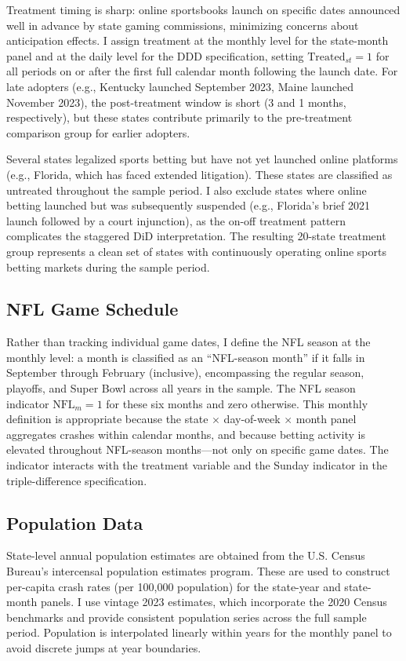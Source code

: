 \documentclass[12pt]{article}
\begin{document}
Treatment timing is sharp: online sportsbooks launch on specific dates announced well in advance by state gaming commissions, minimizing concerns about anticipation effects. I assign treatment at the monthly level for the state-month panel and at the daily level for the DDD specification, setting $\text{Treated}_{st} = 1$ for all periods on or after the first full calendar month following the launch date. For late adopters (e.g., Kentucky launched September 2023, Maine launched November 2023), the post-treatment window is short (3 and 1 months, respectively), but these states contribute primarily to the pre-treatment comparison group for earlier adopters.

Several states legalized sports betting but have not yet launched online platforms (e.g., Florida, which has faced extended litigation). These states are classified as untreated throughout the sample period. I also exclude states where online betting launched but was subsequently suspended (e.g., Florida's brief 2021 launch followed by a court injunction), as the on-off treatment pattern complicates the staggered DiD interpretation. The resulting 20-state treatment group represents a clean set of states with continuously operating online sports betting markets during the sample period.

\subsection{NFL Game Schedule}

Rather than tracking individual game dates, I define the NFL season at the monthly level: a month is classified as an ``NFL-season month'' if it falls in September through February (inclusive), encompassing the regular season, playoffs, and Super Bowl across all years in the sample. The NFL season indicator $\text{NFL}_m = 1$ for these six months and zero otherwise. This monthly definition is appropriate because the state $\times$ day-of-week $\times$ month panel aggregates crashes within calendar months, and because betting activity is elevated throughout NFL-season months---not only on specific game dates. The indicator interacts with the treatment variable and the Sunday indicator in the triple-difference specification.

\subsection{Population Data}

State-level annual population estimates are obtained from the U.S. Census Bureau's intercensal population estimates program. These are used to construct per-capita crash rates (per 100,000 population) for the state-year and state-month panels. I use vintage 2023 estimates, which incorporate the 2020 Census benchmarks and provide consistent population series across the full sample period. Population is interpolated linearly within years for the monthly panel to avoid discrete jumps at year boundaries.
\end{document}
